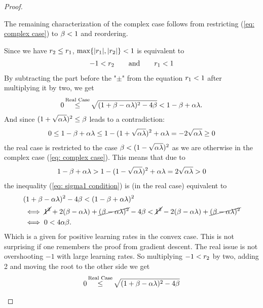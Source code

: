 \begin{proof}
\begin{description}[wide, labelindent=0pt]
		The remaining characterization of the complex case follows from
		restricting (\ref{eq: complex case}) to \(\beta<1\) and reordering.
		\item[Real Case:] Since we have \(r_2 \le r_1\),
		\(\max\{|r_1|,|r_2|\}<1\) is equivalent to
		\begin{align*}
			-1 < r_2 \qquad \text{and} \qquad r_1 < 1
		\end{align*}
		By subtracting the part before the "\(\pm\)" from the equation \(r_1<1\)
		after multiplying it by two, we get
		\begin{align}\label{eq: sigma1 condition}
			0\xle{\text{Real Case}} \sqrt{(1+\momCoeff-\lrSq\hesseEV)^2 -4\momCoeff} < 1-\momCoeff +\lrSq\hesseEV.
		\end{align}
		And since \((1+\sqrt{\alpha\lambda})^2 \le \beta\) leads to a contradiction:
		\begin{align*}
			0 \le 1-\beta+\alpha\lambda \le 1-(1+\sqrt{\alpha\lambda})^2 +\alpha\lambda
			= -2\sqrt{\alpha\lambda} \ge 0
		\end{align*}
		the real case is restricted to the case \(\beta < (1-\sqrt{\alpha\lambda})^2\)
		as we are otherwise in the complex case (\ref{eq: complex case}).
		This means that due to
		\begin{align*}
			1-\beta+\alpha\lambda
			> 1 - (1-\sqrt{\alpha\lambda})^2 + \alpha\lambda
			= 2\sqrt{\alpha\lambda}>0
		\end{align*}
		the inequality (\ref{eq: sigma1 condition}) is (in the real case) equivalent to
		\begin{align*}
			&(1+\beta-\alpha\lambda)^2 - 4\beta < (1-\beta+\alpha\lambda)^2\\
			&\iff \cancel{1^2} + 2(\beta-\alpha\lambda) + 
			\cancel{(\beta-\alpha\lambda)^2} - 4\beta
			< \cancel{1^2} - 2(\beta-\alpha\lambda) + 
			\cancel{(\beta-\alpha\lambda)^2}\\
			&\iff 0 < 4\alpha\beta.
		\end{align*}
		Which is a given for positive learning rates in the convex	
		case. This is not surprising if one remembers the proof from gradient
		descent. The real issue is not overshooting \(-1\) with large learning
		rates. So multiplying \(-1<r_2\) by two, adding 2 and moving the
		root to the other side we get
		\begin{align}\label{eq: from -1<sigma_2 followed}
			0 \xle{\text{Real Case}} \sqrt{(1+\momCoeff-\lrSq\hesseEV)^2 - 4\momCoeff}

\end{align}
\end{description}
\end{proof}
